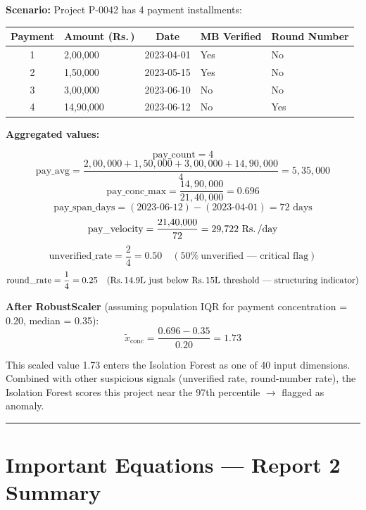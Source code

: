 \documentclass[11pt,a4paper]{article}
\DeclareRobustCommand{\INR}{\textbf{Rs.\,}}
\DeclareRobustCommand{\INR}{₹}
\begin{document}
\textbf{Scenario:} Project P-0042 has 4 payment installments:

\begin{table}[htbp]
\centering
\small
\begin{tabularx}{\textwidth}{c l c l Y}
\toprule
\textbf{Payment} & \textbf{Amount (\INR{})} & \textbf{Date} & \textbf{MB Verified} & \textbf{Round Number} \\
 & 2,00,000 & 2023-04-01 & Yes & No \\
2 & 1,50,000 & 2023-05-15 & Yes & No \\
3 & 3,00,000 & 2023-06-10 & No & No \\
4 & 14,90,000 & 2023-06-12 & No & Yes \\
\bottomrule
\end{tabularx}
\end{table}


\textbf{Aggregated values:}

\[ \text{pay\_count} = 4 \]
\[ \text{pay\_avg} = \frac{2{,}00{,}000 + 1{,}50{,}000 + 3{,}00{,}000 + 14{,}90{,}000}{4} = 5{,}35{,}000 \]
\[ \text{pay\_conc\_max} = \frac{14{,}90{,}000}{21{,}40{,}000} = 0.696 \]
\[ \text{pay\_span\_days} = (2023\text{-}06\text{-}12) - (2023\text{-}04\text{-}01) = 72 \text{ days} \]
\[ \text{pay\_velocity} = \frac{21{,}40{,}000}{72} = 29{,}722 \text{ \text{Rs.\,}/day} \]
\[ \text{unverified\_rate} = \frac{2}{4} = 0.50 \quad (50\%\ \text{unverified — critical flag}) \]
\[ \text{round\_rate} = \frac{1}{4} = 0.25 \quad (\text{\text{Rs.\,}14.9L just below \text{Rs.\,}15L threshold — structuring indicator}) \]

\textbf{After RobustScaler} (assuming population IQR for payment concentration = 0.20, median = 0.35):
\[ \tilde{x}_\text{conc} = \frac{0.696 - 0.35}{0.20} = 1.73 \]

This scaled value 1.73 enters the Isolation Forest as one of 40 input dimensions. Combined with other suspicious signals (unverified rate, round-number rate), the Isolation Forest scores this project near the 97th percentile $\rightarrow$ flagged as anomaly.

\vspace{1em}\hrule\vspace{1em}

\section{Important Equations --- Report 2 Summary}
\end{document}
